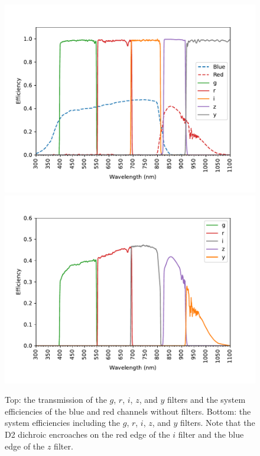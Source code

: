 \begin{figure}
\centering
\includegraphics[width=0.80\linewidth]{figure/filters-0.pdf}
\includegraphics[width=0.80\linewidth]{figure/system-filters-0.pdf}
\caption{Top: the transmission of the $g$, $r$, $i$, $z$, and $y$ filters and the system efficiencies of the blue and red channels without filters. Bottom: the system efficiencies including the $g$, $r$, $i$, $z$, and $y$ filters. Note that the D2 dichroic encroaches on the red edge of the $i$ filter and the blue edge of the $z$ filter.}
\label{figure:system-filters-grizy}
\end{figure}

